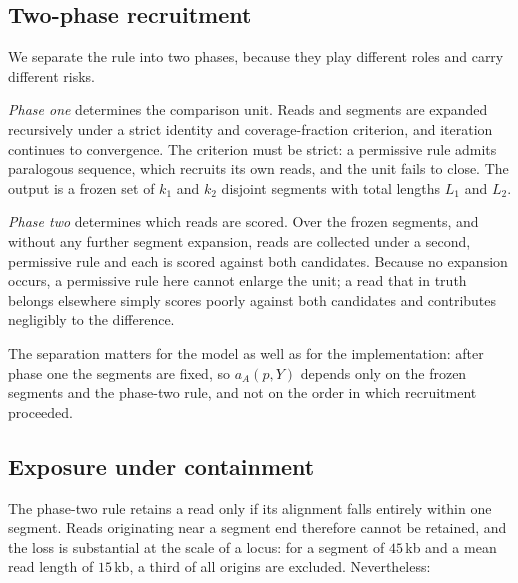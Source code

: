 \documentclass[11pt]{article}
\begin{document}
\subsection{Two-phase recruitment}
\label{sec:two-phase}

We separate the rule into two phases, because they play different roles and
carry different risks.

\emph{Phase one} determines the comparison unit.  Reads and segments are
expanded recursively under a strict identity and coverage-fraction criterion,
and iteration continues to convergence.  The criterion must be strict: a
permissive rule admits paralogous sequence, which recruits its own reads, and
the unit fails to close.  The output is a frozen set of $k_1$ and $k_2$ disjoint
segments with total lengths $L_1$ and $L_2$.

\emph{Phase two} determines which reads are scored.  Over the frozen segments,
and without any further segment expansion, reads are collected under a second,
permissive rule and each is scored against both candidates.  Because no
expansion occurs, a permissive rule here cannot enlarge the unit; a read that
in truth belongs elsewhere simply scores poorly against both candidates and
contributes negligibly to the difference.

The separation matters for the model as well as for the implementation: after
phase one the segments are fixed, so $a_A(p,Y)$ depends only on the frozen
segments and the phase-two rule, and not on the order in which recruitment
proceeded.

\subsection{Exposure under containment}

The phase-two rule retains a read only if its alignment falls entirely within
one segment.  Reads originating near a segment end therefore cannot be
retained, and the loss is substantial at the scale of a locus: for a segment of
$45$\,kb and a mean read length of $15$\,kb, a third of all origins are
excluded.  Nevertheless:
\end{document}
